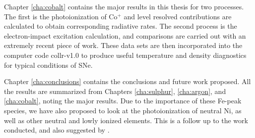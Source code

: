 Chapter \ref{cha:cobalt} contains the major results in this thesis for two processes. The first is the photoionization of Co$^+$ and level resolved contributions are calculated to obtain corresponding radiative rates. The second process is the electron-impact excitation calculation, and comparisons are carried out with an extremely recent piece of work. These data sets are then incorporated into the computer code {\sc collr-v1.0} to produce useful temperature and density diagnostics for typical conditions of SNe.

Chapter \ref{cha:conclusions} contains the conclusions and future work proposed. All the results are summarized from Chapters \ref{cha:sulphur}, \ref{cha:argon}, and \ref{cha:cobalt}, noting the major results. Due to the importance of these Fe-peak species, we have also proposed to look at the photoionization of neutral Ni, as well as other neutral and lowly ionized elements. This is a follow up to the work conducted, and also suggested by \citet{clarathesis}.





